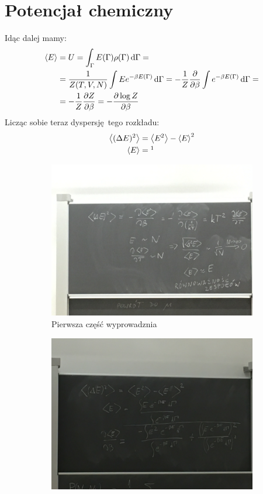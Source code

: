 \documentclass[12pt,a4paper]{report}
\newenvironment{lecture}[1]{\par\medskip
   \noindent\chapter{#1} \rmfamily}{\medskip}
\begin{document}
\begin{lecture}{Potencjał chemiczny}
Idąc dalej mamy:
\begin{align}
    \ev{E} &= U = \int_\Gamma E(\Gamma) \rho(\Gamma) \dd{\Gamma} = \\
    &= \frac{1}{Z(T, V, N)} \int E e^{- \beta E(\Gamma)} \dd{\Gamma} = - \frac{1}{Z}\pdv{\beta}\int e^{- \beta E(\Gamma)} \dd{\Gamma} = \\
    &= -\frac{1}{Z} \pdv{Z}{\beta} = - \pdv{\log Z}{\beta}
\end{align}
Licząc sobie teraz dyspersję tego rozkładu:
\begin{align}
    \ev{(\Delta E)^2} &= \ev{E^2} - \ev{E}^2\\
    \ev{E} &= \footnotemark
\end{align}
\begin{figure}[ht!]
         \centering
         \begin{subfigure}[b]{0.4\textwidth}
             \centering
             \includegraphics[width=\textwidth]{Wyk_8_Rys_1.JPG}
             \caption{Pierwsza część wyprowadznia}
             \label{fig:lec_8:do_przepisania_1.1}
         \end{subfigure}
         \hfill
         \begin{subfigure}[b]{0.4\textwidth}
             \centering
             \includegraphics[width=\textwidth]{Wyk_8_Rys_2.JPG}

\end{subfigure}
\end{figure}
\end{lecture}
\end{document}

